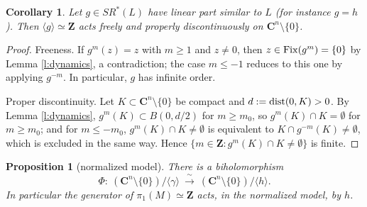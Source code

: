 \documentclass[english,11pt]{amsart}
\newtheorem{corollary}[theorem]{Corollary}
\newtheorem{proposition}[theorem]{Proposition}
\theoremstyle{definition}
\theoremstyle{remark}
\numberwithin{equation}{section}
\newcommand{\Z}{\mathbf{Z}}
\newcommand{\C}{\mathbf{C}}
\newcommand{\dist}{{\rm dist}}
\newcommand{\Fix}{\mathop{\rm Fix}}
\begin{document}
\begin{corollary}\label{c:properlydiscontinuous}
Let $g\in SR^*(L)$ have linear part similar to $L$ (for instance $g=h$). Then $\langle g\rangle\simeq\Z$ acts freely and properly discontinuously on $\C^n\setminus\{0\}$.
\end{corollary}

\begin{proof}
Freeness. If $g^{m}(z)=z$ with $m\ge1$ and $z\neq0$, then $z\in\Fix(g^{m})=\{0\}$ by Lemma \ref{l:dynamics}, a contradiction; the case $m\le-1$ reduces to this one by applying $g^{-m}$. In particular, $g$ has infinite order.

Proper discontinuity. Let $K\subset\C^n\setminus\{0\}$ be compact and $d:=\dist(0,K)>0$. By Lemma \ref{l:dynamics}, $g^{m}(K)\subset B(0,d/2)$ for $m\ge m_0$, so $g^{m}(K)\cap K=\emptyset$ for $m\ge m_0$; and for $m\le-m_0$, $g^{m}(K)\cap K\neq\emptyset$ is equivalent to $K\cap g^{-m}(K)\neq\emptyset$, which is excluded in the same way. Hence $\{m\in\Z: g^{m}(K)\cap K\neq\emptyset\}$ is finite.
\end{proof}

\begin{proposition}[normalized model]\label{p:normalizedmodel}
There is a biholomorphism
\[
\Phi:\ (\C^n\setminus\{0\})/\langle\gamma\rangle\ \xrightarrow{\ \sim\ }\ (\C^n\setminus\{0\})/\langle h\rangle .
\]
In particular the generator of $\pi_1(M)\simeq\Z$ acts, in the normalized model, by $h$.
\end{proposition}
\end{document}
